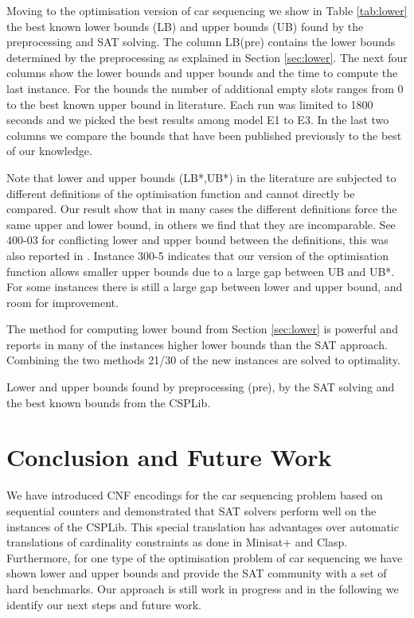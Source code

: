 \documentclass[]{llncs}
\begin{document}
Moving to the optimisation version of car sequencing we show in Table \ref{tab:lower} the best known lower bounds (LB)
and upper bounds (UB) found by the preprocessing and SAT solving. The column LB(pre) contains the lower bounds
determined by the preprocessing as explained in Section \ref{sec:lower}. The next four columns show the lower bounds and upper
bounds and the time to compute the last instance. For the bounds the number of additional empty slots ranges from 0 to
the best known upper bound in literature. Each run was limited to 1800 seconds and we picked the best results among
model E1 to E3. In the last two columns we compare the bounds that have been published previously to the best of our
knowledge.

Note that lower and upper bounds (LB*,UB*) in the literature are subjected to different definitions of the optimisation
function and cannot directly be compared. Our result show that in many cases the different definitions force the same
upper and lower bound, in others we find that they are incomparable. See 400-03 for conflicting lower and upper bound
between the definitions, this was also reported in \cite{Estellon06}. Instance 300-5 indicates that our version of the
optimisation function allows smaller upper bounds due to a large gap between UB and UB*. For some instances there is
still a large gap between lower and upper bound, and room for improvement. 

The method for computing lower bound from Section \ref{sec:lower} is powerful and reports in many of the instances
higher lower bounds than the SAT approach. Combining the two methods 21/30 of the new instances are solved to
optimality.

\begin{table}[htbp]
    \caption{Lower and upper bounds found by preprocessing (pre), by the SAT solving and the best known bounds from the
    CSPLib.}
    \centering
    
    \label{tab:lower}
\end{table}

\section{Conclusion and Future Work}

We have introduced CNF encodings for the car sequencing problem based on sequential counters and demonstrated that SAT
solvers perform well on the instances of the CSPLib. This special translation has advantages over automatic translations
of cardinality constraints as done in Minisat+ and Clasp. Furthermore, for one type of the optimisation problem of car
sequencing we have shown lower and upper bounds and provide the SAT community with a set of hard benchmarks. Our
approach is still work in progress and in the following we identify our next steps and future work. 
\end{document}
